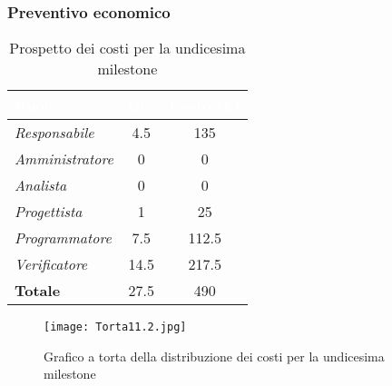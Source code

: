 \newpage
\subsubsection{Preventivo economico}

\begin{table}[H]
    \renewcommand\arraystretch{1.5}
    \centering
    \begin{tabular}{|l|c|c|}
    \hline
    \rowcolor[HTML]{036400}
    \textcolor{white}{\textbf{Ruolo}} & \multicolumn{1}{l|}{\textcolor{white}{\textbf{Ore}}} & \multicolumn{1}{l|}{\textcolor{white}{\textbf{Costo (€)}}} \\ \hline
    \rowcolor[HTML]{EFEFEF}\textit{Responsabile}   & 4.5    & 135    \\ \hline
    \rowcolor[HTML]{C0C0C0}\textit{Amministratore} & 0  & 0     \\ \hline
    \rowcolor[HTML]{EFEFEF}\textit{Analista}       & 0    & 0      \\ \hline
    \rowcolor[HTML]{C0C0C0}\textit{Progettista}    & 1    & 25     \\ \hline
    \rowcolor[HTML]{EFEFEF}\textit{Programmatore}  & 7.5   & 112.5    \\ \hline
    \rowcolor[HTML]{C0C0C0}\textit{Verificatore}   & 14.5   & 217.5    \\ \hline
    \rowcolor[HTML]{EFEFEF}\textbf{Totale}         & 27.5 & 490   \\ \hline
    \end{tabular}
    \caption{Prospetto dei costi per la undicesima milestone}
\end{table}

\begin{figure}[H]
    \texttt{[image: Torta11.2.jpg]}
    \caption{Grafico a torta della distribuzione dei costi per la undicesima milestone}
\end{figure}
